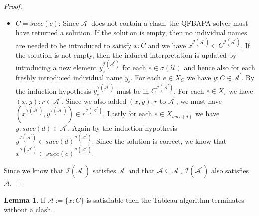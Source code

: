 \documentclass{book}
\theoremstyle{break}
\theoremstyle{definition}
\newtheorem{mylem}{Lemma}
\begin{document}
\begin{proof}
\begin{itemize}
\item $C=succ(c)$: Since $\mathcal{A}^\prime$ does not contain a clash, the QFBAPA solver must have returned a solution. If the solution is empty, then no individual names are needed to be introduced to satisfy $x:C$ and we have $x^{\mathcal{I}(\mathcal{A}^\prime)}\in C^{\mathcal{I}(\mathcal{A}^\prime)}$. If the solution is not empty, then the induced interpretation is updated by introducing a new element $y_e^{\mathcal{I}(\mathcal{A}^\prime)}$ for each $e\in \sigma(\mathcal{U})$ and hence also for each freshly introduced individual name $y_e$. For each $e\in X_C$ we have $y:C\in \mathcal{A}^\prime$. By the induction hypothesis $y_e^{\mathcal{I}(\mathcal{A}^\prime)}$ must be in $C^{\mathcal{I}(\mathcal{A}^\prime)}$. For each $e\in X_r$ we have $(x,y):r\in\mathcal{A}^\prime$. Since we also added $(x,y):r$ to $\mathcal{A}^\prime$, we must have $(x^{\mathcal{I}(\mathcal{A}^\prime)},y^{\mathcal{I}(\mathcal{A}^\prime)})\in r^{\mathcal{I}(\mathcal{A}^\prime)}$. Lastly for each $e\in X_{succ(d)}$ we have $y:succ(d)\in\mathcal{A}^\prime$. Again by the induction hypothesis $y^{\mathcal{I}(\mathcal{A}^\prime)}\in succ(d)^{\mathcal{I}(\mathcal{A}^\prime)}$. Since the solution is correct, we know that $x^{\mathcal{I}(\mathcal{A}^\prime)}\in succ(c)^{\mathcal{I}(\mathcal{A}^\prime)}$.
\end{itemize}
Since we know that $\mathcal{I}(\mathcal{A}^\prime)$ satisfies $\mathcal{A}^\prime$ and that $\mathcal{A}\subseteq \mathcal{A}^\prime$, $\mathcal{I}(\mathcal{A}^\prime)$ also satisfies $\mathcal{A}$.
\end{proof}
\begin{mylem}
If $\mathcal{A}:=\{x:C\}$ is satisfiable then the Tableau-algorithm terminates without a clash.
\end{mylem}
\end{document}
